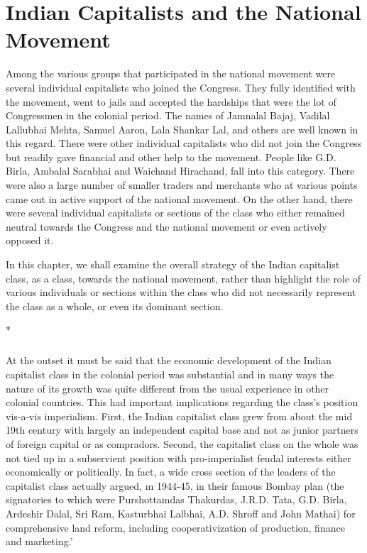 
\chapter{Indian Capitalists and the National Movement}



Among the various groups that participated in the national movement were several individual capitalists who joined the Congress. They fully identified with the movement, went to jails and accepted the hardships that were the lot of Congressmen in the colonial period. The names of Jamnalal Bajaj, Vadilal Lallubhai Mehta, Samuel Aaron, Lala Shankar Lal, and others are well known in this regard. There were other individual capitalists who did not join the Congress but readily gave financial and other help to the movement. People like G.D. Birla, Ambalal Sarabhai and Waichand Hirachand, fall into this category. There were also a large number of smaller traders and merchants who at various points came out in active support of the national movement. On the other hand, there were several individual capitalists or sections of the class who either remained neutral towards the Congress and the national movement or even actively opposed it. 

In this chapter, we shall examine the overall strategy of the Indian capitalist class, as a class, towards the national movement, rather than highlight the role of various individuals or sections within the class who did not necessarily represent the class as a whole, or even its dominant section.

\begin{center}*\end{center}

\paragraph*{}


At the outset it must be said that the economic development of the Indian capitalist class in the colonial period was substantial and in many ways the nature of its growth was quite different from the usual experience in other colonial countries. This had important implications regarding the class's position vis-a-vis imperialism. First, the Indian capitalist class grew from about the mid 19th century with largely an independent capital base and not as junior partners of foreign capital or as compradors. Second, the capitalist class on the whole was not tied up in a subservient position with pro-imperialist feudal interests either economically or politically. In fact, a wide cross section of the leaders of the capitalist class actually argued, m 1944-45, in their famous Bombay plan (the signatories to which were Purshottamdas Thakurdas, J.R.D. Tata, G.D. Birla, Ardeshir Dalal, Sri Ram, Kasturbhai Lalbhai, A.D. Shroff and John Mathai) for comprehensive land reform, including cooperativization of production, finance and marketing.' 

